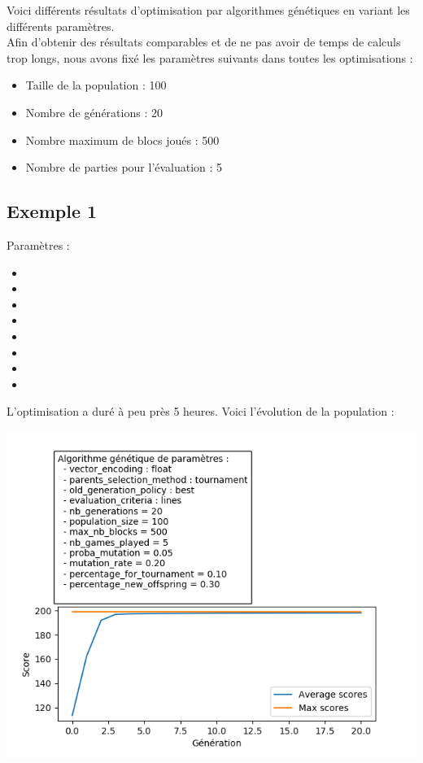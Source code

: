 Voici différents résultats d'optimisation par algorithmes génétiques en variant les différents paramètres. \\
Afin d'obtenir des résultats comparables et de ne pas avoir de temps de calculs trop longs, nous avons fixé les paramètres suivants dans toutes les optimisations :
\begin{itemize}
	\item Taille de la population : 100
	\item Nombre de générations : 20
	\item Nombre maximum de blocs joués : 500
	\item Nombre de parties pour l'évaluation : 5
\end{itemize} 

\newpage

\subsection{Exemple 1}
Paramètres :
\begin{itemize}
	\item {}
	\item {}
	\item {}
	\item {}
	\item {}
	\item {}
	\item {}
	\item {}
\end{itemize} 

L'optimisation a duré à peu près 5 heures. Voici l'évolution de la population :

\includegraphics[scale=0.95]{media/results/AG01.png}


